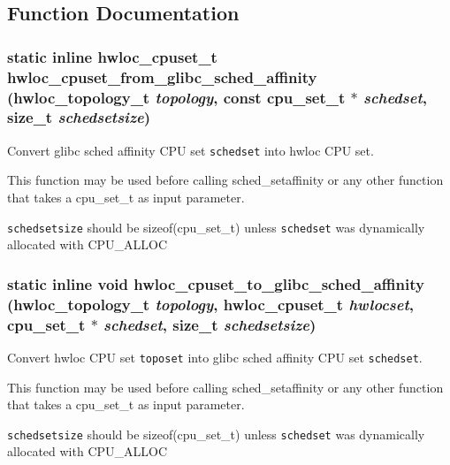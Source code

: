 \subsection{Function Documentation}
\hypertarget{group__hwlocality__glibc__sched_g95a1b94fc109895ee13b17bddac08f5f}{
\subsubsection[{hwloc\_\-cpuset\_\-from\_\-glibc\_\-sched\_\-affinity}]{\setlength{\rightskip}{0pt plus 5cm}static inline {\bf hwloc\_\-cpuset\_\-t} hwloc\_\-cpuset\_\-from\_\-glibc\_\-sched\_\-affinity ({\bf hwloc\_\-topology\_\-t} {\em topology}, \/  const cpu\_\-set\_\-t $\ast$ {\em schedset}, \/  size\_\-t {\em schedsetsize})}}
\label{group__hwlocality__glibc__sched_g95a1b94fc109895ee13b17bddac08f5f}


Convert glibc sched affinity CPU set {\tt schedset} into hwloc CPU set. 

This function may be used before calling sched\_\-setaffinity or any other function that takes a cpu\_\-set\_\-t as input parameter.

{\tt schedsetsize} should be sizeof(cpu\_\-set\_\-t) unless {\tt schedset} was dynamically allocated with CPU\_\-ALLOC \hypertarget{group__hwlocality__glibc__sched_g8d52ded42a9b3d832672d642798cdd8a}{
\subsubsection[{hwloc\_\-cpuset\_\-to\_\-glibc\_\-sched\_\-affinity}]{\setlength{\rightskip}{0pt plus 5cm}static inline void hwloc\_\-cpuset\_\-to\_\-glibc\_\-sched\_\-affinity ({\bf hwloc\_\-topology\_\-t} {\em topology}, \/  {\bf hwloc\_\-cpuset\_\-t} {\em hwlocset}, \/  cpu\_\-set\_\-t $\ast$ {\em schedset}, \/  size\_\-t {\em schedsetsize})}}
\label{group__hwlocality__glibc__sched_g8d52ded42a9b3d832672d642798cdd8a}


Convert hwloc CPU set {\tt toposet} into glibc sched affinity CPU set {\tt schedset}. 

This function may be used before calling sched\_\-setaffinity or any other function that takes a cpu\_\-set\_\-t as input parameter.

{\tt schedsetsize} should be sizeof(cpu\_\-set\_\-t) unless {\tt schedset} was dynamically allocated with CPU\_\-ALLOC 
